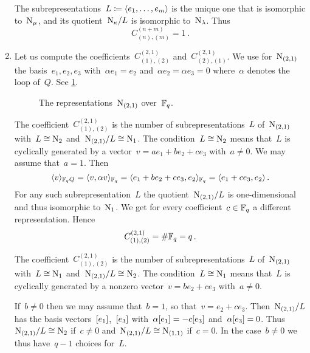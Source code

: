 \documentclass[a4paper,11pt]{scrartcl}
\begin{document}
\begin{example}
\begin{enumerate}
      The subrepresentations~$L \coloneqq \langle e_1, \dotsc, e_m\rangle$ is the unique one that is isomorphic to~$\mathrm{N}_\mu$, and its quotient~$\mathrm{N}_\kappa / L$ is isomorphic to~$\mathrm{N}_\lambda$.
      Thus
      \[
        C^{(n+m)}_{(n),(m)}
        =
        1 \,.
      \]
    \item
      Let us compute the coefficients~$C^{(2,1)}_{(1),(2)}$ and~$C^{(2,1)}_{(2),(1)}$.
      We use for~$\mathrm{N}_{(2,1)}$ the basis~$e_1, e_2, e_3$ with~$\alpha e_1 = e_2$ and~$\alpha e_2 = \alpha e_3 = 0$ where~$\alpha$ denotes the loop of~$Q$.
      See \cref{basis for 2 1}.
      \begin{figure}[tb]
        \centering
          \caption{The representations~$\mathrm{N}_{(2,1)}$ over~$\mathbb{F}_q$.}
        \label{basis for 2 1}
      \end{figure}

      The coefficient~$C^{(2,1)}_{(1),(2)}$ is the number of subrepresentations~$L$ of~$\mathrm{N}_{(2,1)}$ with~$L \cong \mathrm{N}_2$ and~$\mathrm{N}_{(2,1)}/L \cong \mathrm{N}_1$.
      The condition~$L \cong \mathrm{N}_2$ means that~$L$ is cyclically generated by a vector~$v = a e_1 + b e_2 + c e_3$ with~$a \neq 0$.
      We may assume that~$a = 1$.
      Then
      \[
        \langle v\rangle_{\mathbb{F}_q Q}
        =
        \langle v , \alpha v \rangle_{\mathbb{F}_q}
        =
        \langle e_1 + b e_2 + c e_3, e_2 \rangle_{\mathbb{F}_q}
        =
        \langle e_1 + c e_3, e_2 \rangle \,.
      \]
      For any such subrepresentation~$L$ the quotient~$\mathrm{N}_{(2,1)}/L$ is one-dimensional and thus isomorphic to~$\mathrm{N}_1$.
      We get for every coefficient~$c \in \mathbb{F}_q$ a different representation.
      Hence
      \[
        C^{(2,1)}_{(1),(2)}
        =
        \# \mathbb{F}_q
        =
        q \,.
      \]

      The coefficient~$C^{(2,1)}_{(1),(2)}$ is the number of subrepresentations~$L$ of~$\mathrm{N}_{(2,1)}$ with~$L \cong \mathrm{N}_1$ and~$\mathrm{N}_{(2,1)}/L \cong \mathrm{N}_2$.
      The condition~$L \cong \mathrm{N}_1$ means that~$L$ is cyclically generated by a nonzero vector~$v = b e_2 + c e_3$ with~$a \neq 0$.

      If~$b \neq 0$ then we may assume that~$b = 1$, so that~$v = e_2 + c e_3$.
      Then~$\mathrm{N}_{(2,1)}/L$ has the basis vectors~$[e_1]$,~$[e_3]$ with~$\alpha [e_1] = - c [e_3]$ and~$\alpha [e_3] = 0$.
      Thus~$\mathrm{N}_{(2,1)}/L \cong \mathrm{N}_2$ if~$c \neq 0$ and~$\mathrm{N}_{(2,1)}/L \cong \mathrm{N}_{(1,1)}$ if~$c = 0$.
      In the case~$b \neq 0$ we thus have~$q - 1$ choices for~$L$.


\end{enumerate}
\end{example}
\end{document}
